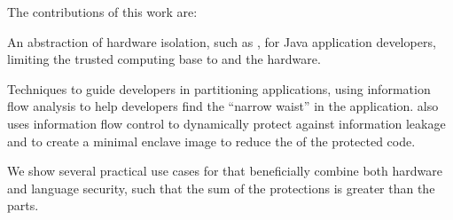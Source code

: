 The contributions of this work are:

\begin{compactitem}
\item An abstraction of hardware isolation, such as \sgx{}, for Java application developers, limiting the trusted computing base to \sysname{} and the hardware.  
\item Techniques to guide developers in partitioning applications, using information flow analysis to help developers find the ``narrow waist'' in the application.  \sysname{} also uses information flow control to dynamically protect against information leakage %
and
to create a minimal enclave image to reduce the \tcbsize{} of the protected code.
\item We show several practical use cases for \sysname{} that beneficially combine both hardware and language security,
such that the sum of the protections is greater than the parts.

\end{compactitem}

